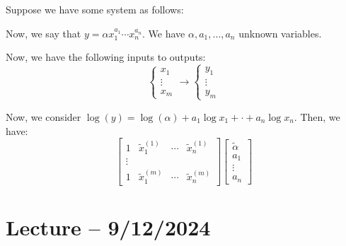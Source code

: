 \documentclass[openany]{book}
\begin{document}
\begin{example}
	Suppose we have some system as follows:
	\begin{center}
	\end{center}

	Now, we say that $y = \alpha x_1^{a_1} \cdots x_n^{a_n}$. We have $\alpha, a_1, \ldots, a_n$ unknown variables.
	
	Now, we have the following inputs to outputs:
	\begin{equation*}
		\begin{cases}
			x_1 \\ \vdots \\ x_m
		\end{cases}
		\rightarrow
		\begin{cases}
			y_1 \\ \vdots \\ y_m
		\end{cases}
	\end{equation*}

	Now, we consider $\log (y) = \log(\alpha) + a_1\log x_1 + \cdot + a_n \log x_n$. Then, we have:
	\begin{equation*}
		\begin{bmatrix}
			1 & \tilde{x}_1^{(1)} & \cdots & \tilde{x}_n^{(1)} \\
			\vdots & &  & \\
			1 & \tilde{x}_1^{(m)} & \cdots & \tilde{x}_n^{(m)}
	 	\end{bmatrix}
 		\begin{bmatrix}
 			\tilde{\alpha} \\
 			a_1 \\
 			\vdots \\
 			a_n
 		\end{bmatrix}
	\end{equation*}
\end{example}

\section{Lecture -- 9/12/2024}
\end{document}
